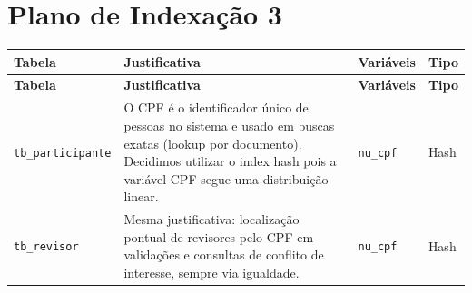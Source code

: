 \documentclass[a4paper,11pt]{article}
\begin{document}
\bigskip
\section*{Plano de Indexação 3}

\begin{longtable}{|l|p{7cm}|l|l|}
\hline
\textbf{Tabela} & \textbf{Justificativa} & \textbf{Variáveis} & \textbf{Tipo} \\
\hline
\endfirsthead
\hline
\textbf{Tabela} & \textbf{Justificativa} & \textbf{Variáveis} & \textbf{Tipo} \\
\hline
\endhead
\texttt{tb\_participante} & O CPF é o identificador único de pessoas no sistema e usado em buscas exatas (lookup por documento). Decidimos utilizar o index hash pois a variável CPF segue uma distribuição linear. & \texttt{nu\_cpf} & Hash \\
\hline
\texttt{tb\_revisor} & Mesma justificativa: localização pontual de revisores pelo CPF em validações e consultas de conflito de interesse, sempre via igualdade. & \texttt{nu\_cpf} & Hash \\
\hline
\end{longtable}
\end{document}
